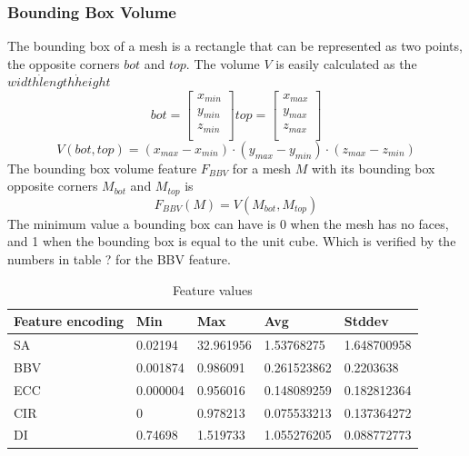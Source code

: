 \documentclass{bigdata}
\begin{document}
\subsubsection{Bounding Box Volume}
The bounding box of a mesh is a rectangle that can be represented as two points, the opposite corners $bot$ and $top$. The volume $V$ is easily calculated as the $width \dot length \dot height$
\[
bot =
\begin{bmatrix}
x_{min} \\
y_{min} \\
z_{min} \\
\end{bmatrix}
top =
\begin{bmatrix}
x_{max} \\
y_{max} \\
z_{max} \\
\end{bmatrix}
\]
\begin{equation}
V(bot,top) = (x_{max} - x_{min}) \cdot (y_{max}-y_{min}) \cdot (z_{max}-z_{min})
\end{equation}
The bounding box volume feature $F_{BBV}$ for a mesh $M$ with its bounding box opposite corners $M_{bot}$ and $M_{top}$ is
\begin{equation}
F_{BBV}(M) = V(M_{bot},M_{top})
\end{equation}
The minimum value a bounding box can have is 0 when the mesh has no faces, and 1 when the bounding box is equal to the unit cube. Which is verified by the numbers in table ? for the BBV feature. 
\begin{table}[h!]
	\begin{center}
	    \begin{tabular}{ l | l | l | l | l }
	    \hline
	    Feature encoding & Min & Max & Avg & Stddev \\ \hline
	    SA & 0.02194 & 32.961956 & 1.53768275 & 1.648700958 \\ 
	    BBV & 0.001874 & 0.986091 & 0.261523862 & 0.2203638 \\
	    ECC & 0.000004 & 0.956016 & 0.148089259 & 0.182812364 \\ 
		CIR & 0 & 0.978213 & 0.075533213 & 0.137364272 \\ 
		DI & 0.74698 & 1.519733 & 1.055276205  & 0.088772773 \\ 	
	    \end{tabular}
	\end{center}
\caption{Feature values}
\label{Table 1, }
\end{table}
\end{document}
